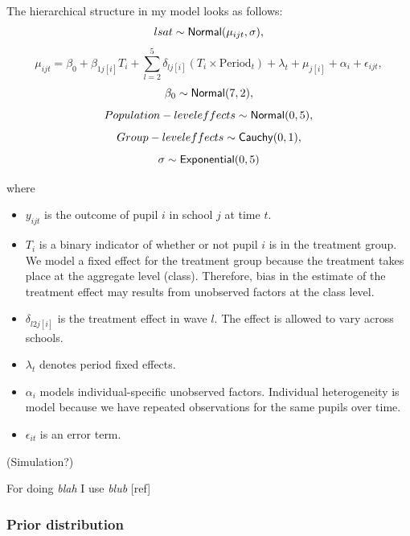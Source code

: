 \documentclass[a4, 12pt]{article}
\providecommand{\tightlist}{%
  \setlength{\itemsep}{0pt}\setlength{\parskip}{0pt}}
\begin{document}
The hierarchical structure in my model looks as follows:
\[lsat \sim {\sf Normal} (\mu_{ijt}, \sigma),\]
\[\mu_{ijt} = \beta_0 + \beta_{1j[i]} T_i + \sum\limits_{l=2}^5\delta_{lj[i]} (T_{i} \times \text{Period}_{t}) + \lambda_t + \mu_{j[i]} + \alpha_{i} + \epsilon_{ijt},\]
\[\beta_0 \sim  {\sf Normal}(7,2),\]
\[Population-level effects \sim {\sf Normal}(0,5),\]
\[Group-level effects \sim {\sf Cauchy}(0,1),\]
\[\sigma \sim {\sf Exponential}(0,5)\]

where

\begin{itemize}
\tightlist
\item
  \(y_{ijt}\) is the outcome of pupil \(i\) in school \(j\) at time \(t\).
\item
  \(T_{i}\) is a binary indicator of whether or not pupil \(i\) is in the treatment group. We model a fixed effect for the treatment group because the treatment takes place at the aggregate level (class). Therefore, bias in the estimate of the treatment effect may results from unobserved factors at the class level.
\item
  \(\delta_{l2j[i]}\) is the treatment effect in wave \(l\). The effect is allowed to vary across schools.
\item
  \(\lambda_t\) denotes period fixed effects.
\item
  \(\alpha_{i}\) models individual-specific unobserved factors. Individual heterogeneity is model because we have repeated observations for the same pupils over time.
\item
  \(\epsilon_{it}\) is an error term.
\end{itemize}

(Simulation?)

For doing \emph{blah} I use \emph{blub} {[}ref{]}

\hypertarget{prior-distribution}{%
\subsubsection{Prior distribution}\label{prior-distribution}}
\end{document}
